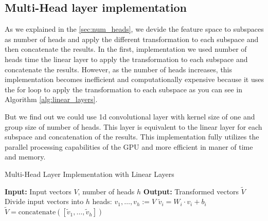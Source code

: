 \documentclass[sigconf, nonacm]{acmart}
\begin{document}
\subsection{Multi-Head layer implementation}
As we explained in the \ref{sec:num_heads}, we devide the feature space to subspaces as number of heads and apply the different transformation to each subspace and then concatenate the results. In the first, implementation we used number of heads time the linear layer to apply the transformation to each subspace and concatenate the results. However, as the number of heads increases, this implementation becomes inefficient and computationally expensive because it uses the for loop to apply the transformation to each subspace as you can see in Algorithm \ref{alg:linear_layers}.

But we find out we could use 1d convolutional layer with kernel size of one and group size of number of heads. This layer is equivalent to the linear layer for each subspace and concatenation of the results. This implementation fully utilizes the parallel processing capabilities of the GPU and more efficient in maner of time and memory.

\begin{algorithm}
  \caption{Multi-Head Layer Implementation with Linear Layers}
  \label{alg:linear_layers}
  \begin{algorithmic}[1]
    \STATE \textbf{Input:} Input vectors $V$, number of heads $h$
    \STATE \textbf{Output:} Transformed vectors $\tilde{V}$
    \STATE Divide input vectors into $h$ heads: $v_1, \ldots, v_h := V$
    \STATE $\tilde{v}_i = W_i \cdot v_i + b_i$
    \ENDFOR
    \STATE $\tilde{V} = \text{concatenate}([\tilde{v}_1, \ldots, \tilde{v}_h])$
  \end{algorithmic}
\end{algorithm}

\clearpage



\end{document}
